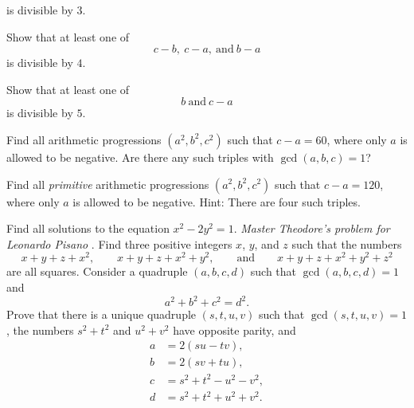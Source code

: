 \begin{challenge}
\begin{subexenum}
\begin{equation*}
    \end{equation*}
    is divisible by $3$.
  \item Show that at least one of
    \begin{equation*}
      c-b,~c-a,~\text{and}~b-a
    \end{equation*}
    is divisible by $4$.
  \item Show that at least one of
    \begin{equation*}
      b~\text{and}~c-a
    \end{equation*}
    is divisible by $5$.
  \item Find all arithmetic progressions $(a^2,b^2,c^2)$ such that $c-a=60$, where only $a$ is allowed to be negative. Are there any such triples with $\gcd(a,b,c)=1$?
  \item Find all \emph{primitive} arithmetic progressions $(a^2,b^2,c^2)$ such that $c-a=120$, where only $a$ is allowed to be negative. Hint: There are four such triples.
  \end{subexenum}
  \exercise Find all solutions to the equation $x^2-2y^2=1$.
  \exercise \emph{Master Theodore's problem for Leonardo Pisano} \cite[Proposition 24]{fibonacci1987}. Find three positive integers $x$, $y$, and $z$ such that the numbers
  \begin{equation*}
    x+y+z+x^2,\qquad x+y+z+x^2+y^2,\qquad\text{and}\qquad x+y+z+x^2+y^2+z^2
  \end{equation*}
  are all squares.
  \exercise Consider a quadruple $(a,b,c,d)$ such that $\gcd(a,b,c,d)=1$ and
  \begin{equation*}
    a^2+b^2+c^2=d^2.
  \end{equation*}
  Prove that there is a unique quadruple $(s,t,u,v)$ such that $\gcd(s,t,u,v)=1$, the numbers $s^2+t^2$ and $u^2+v^2$ have opposite parity, and
  \begin{align*}
    a & = 2(su-tv), \\
    b & = 2(sv+tu), \\
    c & = s^2+t^2-u^2-v^2, \\
    d & = s^2+t^2+u^2+v^2.
  \end{align*}
\end{challenge}

